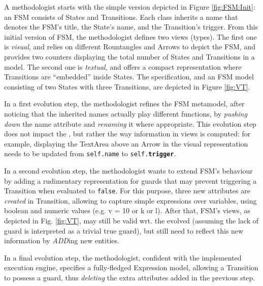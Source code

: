 A methodologist starts with the simple version depicted in Figure \ref{fig:FSM:Init}:
an \textsf{FSM} consists of \textsf{State}s and \textsf{Transition}s. Each class
inherits a \textsf{name} that denotes the \textsf{FSM}'s title, the \textsf{State}'s
name, and the \textsf{Transition}'s trigger. From this initial version of \textsf{FSM},
the methodologist defines two views (types). The first one is \emph{visual},
and relies on different \textsf{Rountangle}s and \textsf{Arrow}s to depict the 
\textsf{FSM}, and provides two counters displaying the total number of \textsf{State}s
and \textsf{Transition}s in a model. The second one is \emph{textual}, and offers
a compact representation where \textsf{Transition}s are ``embedded'' inside 
\textsf{State}s. The specification, and an \textsf{FSM} model consisting of two
\textsf{State}s with three \textsf{Transition}s, are depicted in Figure \ref{fig:VT}.

In a first evolution step, the methodologist refines the \textsf{FSM} metamodel,
after noticing that the inherited \textsf{name}s actually play different functions,
by  \emph{pushing down} the \textsf{name} attribute and \emph{renaming} it where
appropriate. This evolution step does not impact the \viewtypes, but rather the
way information in views is computed: for example, displaying the \textsf{TextArea}
above an \textsf{Arrow} in the visual representation needs to be updated from
\texttt{self.name} to \texttt{self.\textbf{trigger}}. 

In a second evolution step, the methodologist wants to extend \textsf{FSM}'s 
behaviour by adding a rudimentary representation for guards that may prevent
triggering a \textsf{Transition} when evaluated to \texttt{false}. For this purpose,
three new attributes are \emph{created} in \textsf{Transition}, allowing to capture
simple expressions over \textsf{var}iables, using boolean and numeric \textsf{value}s
(e.g. \textsf{v = 10} or \textsf{k or l}). After that, \textsf{FSM}'s views, as 
depicted in Fig. \ref{fig:VT}, may still be valid wrt. the evolved \metamodel 
(assuming the lack of guard is interpreted as a trivial \textsf{true} guard),
but \viewtypes still need to reflect this new information by \emph{ADD}ing new 
entities. 

In a final evolution step, the methodologist, confident with the implemented
execution engine, specifies a fully-fledged \textsf{Expression} model,
allowing a \textsf{Transition} to possess a \textsf{guard}, thus \emph{deleting}
the extra attributes added in the previous step.


